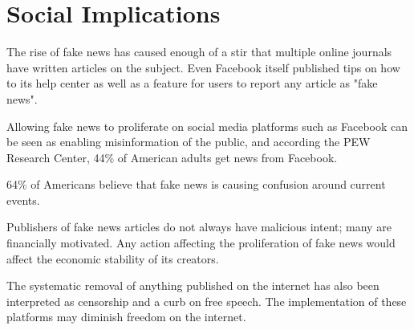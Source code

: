 
\section{Social Implications}


The rise of fake news has caused enough of a stir that multiple online journals have written articles on the subject. \cite{tc_what_is_fake_news,telegraph_fake_news,npr_fake_news} Even Facebook itself published tips on how to its help center \cite{fb_spot_fake_news} as well as a feature for users to report any article as "fake news". \cite{tc_fb_down_ranks_fake_news}

Allowing fake news to proliferate on social media platforms such as Facebook can be seen as enabling misinformation of the public, \cite{tc_facebook_responsibility} and according the PEW Research Center, 44\% of American adults get news from Facebook. \cite{pew_social_media_news} 

64\% of Americans believe that fake news is causing confusion around current events. \cite{pew_fn_confusion}

Publishers of fake news articles do not always have malicious intent; \cite{cbs_fake_news} many are financially motivated. \cite{fb_addressing_hoaxes} Any action affecting the proliferation of fake news would affect the economic stability of its creators.

%
%

The systematic removal of anything published on the internet has also been interpreted as censorship and a curb on free speech. \cite{eff_cali_bill_distrastrous} The implementation of these platforms may diminish freedom on the internet.

